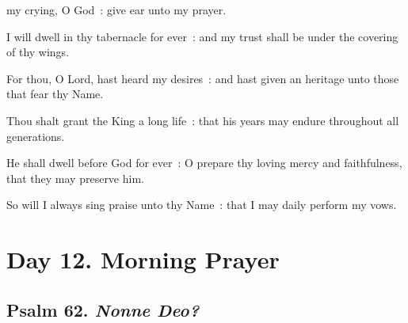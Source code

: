 my crying, O God~: give ear unto my prayer.\par
{}
I will dwell in thy tabernacle for ever~: and my trust shall be under the covering of thy wings.\par
{}For thou, O Lord, hast heard my desires~: and hast given an heritage unto those that fear thy Name.\par
{}Thou shalt grant the King a long life~: that his years may endure throughout all generations.\par
{}He shall dwell before God for ever~: O prepare thy loving mercy and faithfulness, that they may preserve him.\par
{}So will I always sing praise unto thy Name~: that I may daily perform my vows.\par

\section*{Day 12. Morning Prayer}

\subsection{Psalm 62. \textit{Nonne Deo?}}

